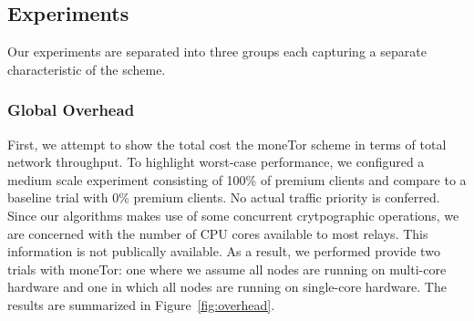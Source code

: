 \subsection{Experiments}
\label{subsec:experiments}
Our experiments are separated into three groups each capturing a separate
characteristic of the scheme.

\subsubsection{Global Overhead}

First, we attempt to show the total cost the moneTor scheme in terms of total
network throughput. To highlight worst-case performance, we configured a medium
scale experiment consisting of 100\% of premium clients and compare to a
baseline trial with 0\% premium clients. No actual traffic priority is
conferred. Since our algorithms makes use of some concurrent crytpographic
operations, we are concerned with the number of CPU cores available to most
relays. This information is not publically available. As a result, we performed
provide two trials with moneTor: one where we assume all nodes are running on
multi-core hardware and one in which all nodes are running on single-core
hardware. The results are summarized in Figure~\ref{fig:overhead}.

